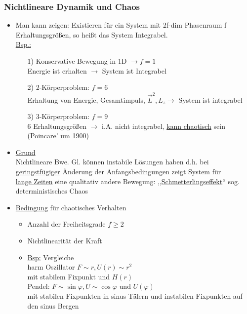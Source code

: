 \documentclass[titlepage,12pt,a4paper,ngerman]{report}
\begin{document}
{\subsubsection{Nichtlineare Dynamik und Chaos}
\begin{itemize}
	\item Man kann zeigen: Existieren für ein System mit 2f-dim Phasenraum f Erhaltungsgrößen, so heißt das System Integrabel.\\
	\underline{Bsp.:}
	\begin{itemize}
		\item[1)] Konservative Bewegung in 1D $\rightarrow f=1$ \\
		Energie ist erhalten $\rightarrow$ System ist Integrabel
		\item[2)] 2-Körperproblem: $f=6$ \\
		Erhaltung von Energie, Gesamtimpuls, $\vec{L}^2, L_z \rightarrow$ System ist integrabel
		\item[3)] 3-Körperproblem: $f=9$\\
		6 Erhaltungsgrößen $\rightarrow$ i.A. nicht integrabel, \underline{kann chaotisch} sein (Poincare' um 1900)
	\end{itemize}
	\item \underline{Grund}\\
	Nichtlineare Bwe. Gl. können instabile Lösungen haben d.h. bei \\\underline{geringstfügiger} Änderung der Anfangsbedingungen zeigt System für \\\underline{lange Zeiten} eine qualitativ andere Bewegung: ,,\underline{Schmetterlingseffekt}`` sog. deterministisches Chaos
	\item \underline{Bedingung} für chaotisches Verhalten
	\begin{itemize}
		\item Anzahl der Freiheitsgrade $f \ge2$ 
		\item Nichtlinearität der Kraft
		\item\underline{Bsp:} Vergleiche\\
		harm Oszillator $F\sim r, U(r) \sim r^2$ \\
		mit stabilem Fixpunkt und $H(r)$\\
		Pendel: $F\sim \sin \varphi, U \sim \cos \varphi$ und $ U(\varphi)$ \\
		mit stabilen Fixpunkten in sinus Tälern und instabilen Fixpunkten auf den sinus Bergen
	\end{itemize}
\end{itemize}

}
\end{document}
